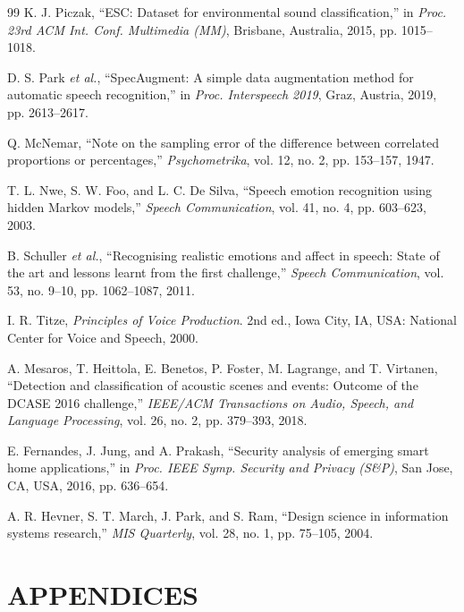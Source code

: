 \documentclass[12pt, a4paper]{report}
\begin{document}
\begin{thebibliography}{99}
K. J. Piczak, ``ESC: Dataset for environmental sound classification,'' in \textit{Proc. 23rd ACM Int. Conf. Multimedia (MM)}, Brisbane, Australia, 2015, pp. 1015--1018.

D. S. Park \textit{et al.}, ``SpecAugment: A simple data augmentation method for automatic speech recognition,'' in \textit{Proc. Interspeech 2019}, Graz, Austria, 2019, pp. 2613--2617.

Q. McNemar, ``Note on the sampling error of the difference between correlated proportions or percentages,'' \textit{Psychometrika}, vol. 12, no. 2, pp. 153--157, 1947.

T. L. Nwe, S. W. Foo, and L. C. De Silva, ``Speech emotion recognition using hidden Markov models,'' \textit{Speech Communication}, vol. 41, no. 4, pp. 603--623, 2003.

B. Schuller \textit{et al.}, ``Recognising realistic emotions and affect in speech: State of the art and lessons learnt from the first challenge,'' \textit{Speech Communication}, vol. 53, no. 9--10, pp. 1062--1087, 2011.

I. R. Titze, \textit{Principles of Voice Production}. 2nd ed., Iowa City, IA, USA: National Center for Voice and Speech, 2000.

A. Mesaros, T. Heittola, E. Benetos, P. Foster, M. Lagrange, and T. Virtanen, ``Detection and classification of acoustic scenes and events: Outcome of the DCASE 2016 challenge,'' \textit{IEEE/ACM Transactions on Audio, Speech, and Language Processing}, vol. 26, no. 2, pp. 379--393, 2018.

E. Fernandes, J. Jung, and A. Prakash, ``Security analysis of emerging smart home applications,'' in \textit{Proc. IEEE Symp. Security and Privacy (S\&P)}, San Jose, CA, USA, 2016, pp. 636--654.

A. R. Hevner, S. T. March, J. Park, and S. Ram, ``Design science in information systems research,'' \textit{MIS Quarterly}, vol. 28, no. 1, pp. 75--105, 2004.

\end{thebibliography}

\clearpage

\chapter*{APPENDICES}
\end{document}
